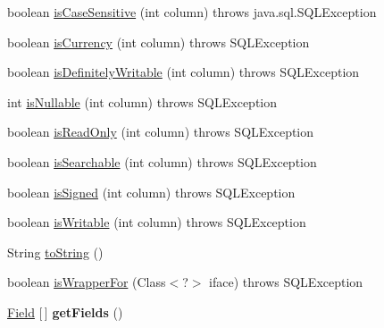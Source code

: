 \begin{DoxyCompactItemize}
\item 
boolean \mbox{\hyperlink{classcom_1_1mysql_1_1cj_1_1jdbc_1_1result_1_1_result_set_meta_data_a100a9826a3a772fc38490ed65d08306d}{is\+Case\+Sensitive}} (int column)  throws java.\+sql.\+S\+Q\+L\+Exception 
\item 
boolean \mbox{\hyperlink{classcom_1_1mysql_1_1cj_1_1jdbc_1_1result_1_1_result_set_meta_data_ac7a3732650739d19c5fa38abc5c3c174}{is\+Currency}} (int column)  throws S\+Q\+L\+Exception 
\item 
boolean \mbox{\hyperlink{classcom_1_1mysql_1_1cj_1_1jdbc_1_1result_1_1_result_set_meta_data_a093b037154dd33aa063eaea7cfde6168}{is\+Definitely\+Writable}} (int column)  throws S\+Q\+L\+Exception 
\item 
int \mbox{\hyperlink{classcom_1_1mysql_1_1cj_1_1jdbc_1_1result_1_1_result_set_meta_data_aa43c80c47922375a72afe54e7a56c865}{is\+Nullable}} (int column)  throws S\+Q\+L\+Exception 
\item 
boolean \mbox{\hyperlink{classcom_1_1mysql_1_1cj_1_1jdbc_1_1result_1_1_result_set_meta_data_abecd50fda9e5c9639b59ac1d0c6d0591}{is\+Read\+Only}} (int column)  throws S\+Q\+L\+Exception 
\item 
boolean \mbox{\hyperlink{classcom_1_1mysql_1_1cj_1_1jdbc_1_1result_1_1_result_set_meta_data_a8f2d4be02326a811c85758f8e2d59313}{is\+Searchable}} (int column)  throws S\+Q\+L\+Exception 
\item 
boolean \mbox{\hyperlink{classcom_1_1mysql_1_1cj_1_1jdbc_1_1result_1_1_result_set_meta_data_af85e5d7b7c03147ed4729bbecb488fd0}{is\+Signed}} (int column)  throws S\+Q\+L\+Exception 
\item 
boolean \mbox{\hyperlink{classcom_1_1mysql_1_1cj_1_1jdbc_1_1result_1_1_result_set_meta_data_ae6883f9f19c1f3e8c515f8d6a2594e88}{is\+Writable}} (int column)  throws S\+Q\+L\+Exception 
\item 
String \mbox{\hyperlink{classcom_1_1mysql_1_1cj_1_1jdbc_1_1result_1_1_result_set_meta_data_a0eafbe5189d19f76e70a011104220551}{to\+String}} ()
\item 
boolean \mbox{\hyperlink{classcom_1_1mysql_1_1cj_1_1jdbc_1_1result_1_1_result_set_meta_data_a297ee666fb7b42a8df2bf1776f9d80e1}{is\+Wrapper\+For}} (Class$<$?$>$ iface)  throws S\+Q\+L\+Exception 
\item 
\mbox{\label{classcom_1_1mysql_1_1cj_1_1jdbc_1_1result_1_1_result_set_meta_data_a2c1182d90a57279d40706dec8ce2f096}} 
\mbox{\hyperlink{classcom_1_1mysql_1_1cj_1_1result_1_1_field}{Field}} \mbox{[}$\,$\mbox{]} {\bfseries get\+Fields} ()
\end{DoxyCompactItemize}
